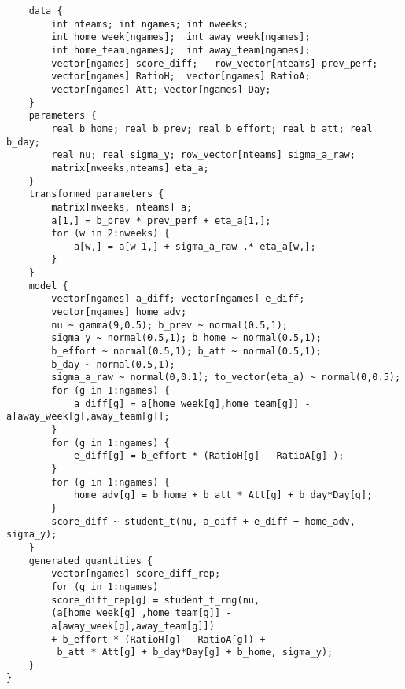 \documentclass[]{article}
\begin{document}
\begin{lstlisting}
	data {
		int nteams; int ngames; int nweeks; 
		int home_week[ngames]; 	int away_week[ngames]; 
		int home_team[ngames]; 	int away_team[ngames]; 
		vector[ngames] score_diff;   row_vector[nteams] prev_perf; 
		vector[ngames] RatioH; 	vector[ngames] RatioA;
		vector[ngames] Att; vector[ngames] Day;  
	}
	parameters {
		real b_home; real b_prev; real b_effort; real b_att; real b_day; 
		real nu; real sigma_y; row_vector[nteams] sigma_a_raw; 
		matrix[nweeks,nteams] eta_a;        
	}
	transformed parameters {
		matrix[nweeks, nteams] a; 
		a[1,] = b_prev * prev_perf + eta_a[1,];
		for (w in 2:nweeks) {
			a[w,] = a[w-1,] + sigma_a_raw .* eta_a[w,];       
		}
	}
	model {
		vector[ngames] a_diff; vector[ngames] e_diff; 
		vector[ngames] home_adv; 
		nu ~ gamma(9,0.5); b_prev ~ normal(0.5,1);
		sigma_y ~ normal(0.5,1); b_home ~ normal(0.5,1);
		b_effort ~ normal(0.5,1); b_att ~ normal(0.5,1);
		b_day ~ normal(0.5,1);
		sigma_a_raw ~ normal(0,0.1); to_vector(eta_a) ~ normal(0,0.5);
		for (g in 1:ngames) {
			a_diff[g] = a[home_week[g],home_team[g]] - a[away_week[g],away_team[g]];
		}
		for (g in 1:ngames) {
			e_diff[g] = b_effort * (RatioH[g] - RatioA[g] );
		}
		for (g in 1:ngames) {
			home_adv[g] = b_home + b_att * Att[g] + b_day*Day[g];
		}
		score_diff ~ student_t(nu, a_diff + e_diff + home_adv, sigma_y);
	}
	generated quantities {
		vector[ngames] score_diff_rep;
		for (g in 1:ngames)
		score_diff_rep[g] = student_t_rng(nu, 
		(a[home_week[g] ,home_team[g]] - 
		a[away_week[g],away_team[g]]) 
		+ b_effort * (RatioH[g] - RatioA[g]) +
		 b_att * Att[g] + b_day*Day[g] + b_home, sigma_y);
	}
}
\end{lstlisting}
\end{document}
